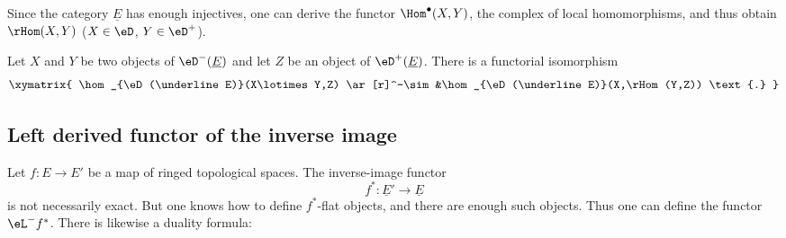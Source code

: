 Since the category $\underline E$ has enough injectives, one can derive
the functor $\Hom^\bullet(X,Y)$, the complex of local homomorphisms, and
thus obtain $\rHom(X,Y)$ ($X\in \eD$, $Y\in \eD^+$).

Let $X$ and $Y$ be two objects of $\eD^-(\underline E)$ and let $Z$ be an object
of $\eD^+(\underline E)$. There is a functorial isomorphism
\[\xymatrix{
  \hom_{\eD(\underline E)}(X\lotimes Y,Z) \ar[r]^-\sim
    &\hom_{\eD(\underline E)}(X,\rHom(Y,Z)) \text{.}
}\]

\subsection{Left derived functor of the inverse image}\label{VIII:6-3}

Let $f:E\to E'$ be a map of ringed topological spaces. The inverse-image
functor
\[
  f^\ast:\underline{E}' \to \underline E
\]
is not necessarily exact. But one knows how to define $f^\ast$-flat
objects, and there are enough such objects. Thus one can define the
functor $\eL^- f^\ast$. There is likewise a duality formula:

